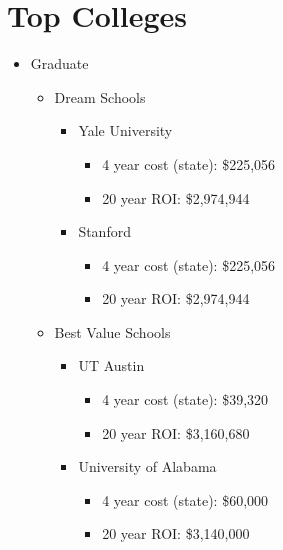 \section{Top Colleges}
\begin{itemize}
    \item{Graduate} 
    \begin{itemize}
        \item{Dream Schools}
            \begin{itemize}
                \item{Yale University}
                    \begin{itemize}
                        \item{4 year cost (state):} \$225,056 
                        \item{20 year ROI:} \$2,974,944 
                    \end{itemize}
                \item{Stanford}
                    \begin{itemize}
                        \item{4 year cost (state):} \$225,056
                        \item{20 year ROI:} \$2,974,944 
                    \end{itemize}
            \end{itemize}
        \item{Best Value Schools} 
            \begin{itemize}
                \item{UT Austin}
                    \begin{itemize}
                        \item{4 year cost (state):} \$39,320 
                        \item{20 year ROI:} \$3,160,680 
                    \end{itemize}
                \item{University of Alabama}
                    \begin{itemize}
                        \item{4 year cost (state):} \$60,000 
                        \item{20 year ROI:} \$3,140,000 
                    \end{itemize}
            \end{itemize}
    \end{itemize}
\end{itemize}

